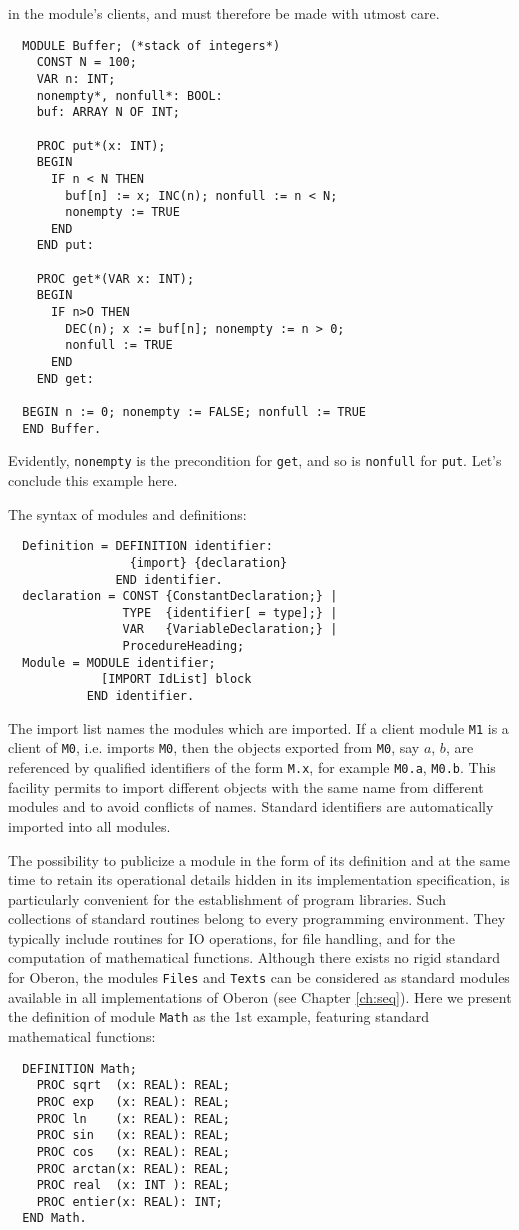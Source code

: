 in the module's clients, and must therefore be made with utmost care.
\begin{verbatim}
  MODULE Buffer; (*stack of integers*)
    CONST N = 100;
    VAR n: INT;
    nonempty*, nonfull*: BOOL:
    buf: ARRAY N OF INT;
 
    PROC put*(x: INT);
    BEGIN
      IF n < N THEN
        buf[n] := x; INC(n); nonfull := n < N;
        nonempty := TRUE
      END
    END put:
 
    PROC get*(VAR x: INT);
    BEGIN
      IF n>O THEN
        DEC(n); x := buf[n]; nonempty := n > 0;
        nonfull := TRUE
      END
    END get:
 
  BEGIN n := 0; nonempty := FALSE; nonfull := TRUE
  END Buffer.
\end{verbatim}
Evidently, \verb|nonempty| is the precondition for \verb|get|, and so is \verb|nonfull|
for \verb|put|. Let's conclude this example here.

The syntax of modules and definitions:
\begin{verbatim}
  Definition = DEFINITION identifier:
                 {import} {declaration}
               END identifier.
  declaration = CONST {ConstantDeclaration;} |
                TYPE  {identifier[ = type];} |
                VAR   {VariableDeclaration;} |
                ProcedureHeading;
  Module = MODULE identifier;
             [IMPORT IdList] block
           END identifier.
\end{verbatim}
The import list names the modules which are imported. If a client module \verb|M1| is a
client of \verb|M0|, i.e. imports \verb|M0|, then the objects exported from \verb|M0|,
say $a$, $b$, are referenced by qualified identifiers of the form \verb|M.x|, for example
\verb|M0.a|, \verb|M0.b|. This facility permits to import different objects with the same
name from different modules and to avoid conflicts of names. Standard identifiers are
automatically imported into all modules.

The possibility to publicize a module in the form of its definition and at the same time
to retain its operational details hidden in its implementation specification, is particularly
convenient for the establishment of program libraries. Such collections of standard routines
belong to every programming environment. They typically include routines for IO operations,
for file handling, and for the computation of mathematical functions. Although there exists
no rigid standard for Oberon, the modules \verb|Files| and \verb|Texts| can be considered
as standard modules available in all implementations of Oberon (see Chapter \ref{ch:seq}).
Here we present the definition of module \verb|Math| as the 1st example,
featuring standard mathematical functions:
\begin{verbatim}
  DEFINITION Math;
    PROC sqrt  (x: REAL): REAL;
    PROC exp   (x: REAL): REAL;
    PROC ln    (x: REAL): REAL;
    PROC sin   (x: REAL): REAL;
    PROC cos   (x: REAL): REAL;
    PROC arctan(x: REAL): REAL;
    PROC real  (x: INT ): REAL;
    PROC entier(x: REAL): INT;
  END Math.
\end{verbatim}
